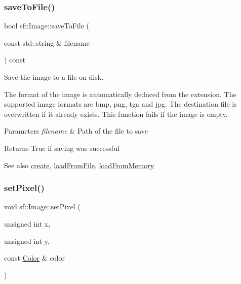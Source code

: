 \subsubsection{\texorpdfstring{save\+To\+File()}{saveToFile()}}
{\footnotesize\ttfamily bool sf\+::\+Image\+::save\+To\+File (\begin{DoxyParamCaption}\item[{const std\+::string \&}]{filename }\end{DoxyParamCaption}) const}



Save the image to a file on disk. 

The format of the image is automatically deduced from the extension. The supported image formats are bmp, png, tga and jpg. The destination file is overwritten if it already exists. This function fails if the image is empty.


\begin{DoxyParams}{Parameters}
{\em filename} & Path of the file to save\\
\hline
\end{DoxyParams}
\begin{DoxyReturn}{Returns}
True if saving was successful
\end{DoxyReturn}
\begin{DoxySeeAlso}{See also}
\hyperlink{classsf_1_1_image_a2a67930e2fd9ad97cf004e918cf5832b}{create}, \hyperlink{classsf_1_1_image_a9e4f2aa8e36d0cabde5ed5a4ef80290b}{load\+From\+File}, \hyperlink{classsf_1_1_image_aaa6c7afa5851a51cec6ab438faa7354c}{load\+From\+Memory} 
\end{DoxySeeAlso}
\mbox{\label{classsf_1_1_image_a9fd329b8cd7d4439e07fb5d3bb2d9744}} 
\subsubsection{\texorpdfstring{set\+Pixel()}{setPixel()}}
{\footnotesize\ttfamily void sf\+::\+Image\+::set\+Pixel (\begin{DoxyParamCaption}\item[{unsigned int}]{x,  }\item[{unsigned int}]{y,  }\item[{const \hyperlink{classsf_1_1_color}{Color} \&}]{color }\end{DoxyParamCaption})}




